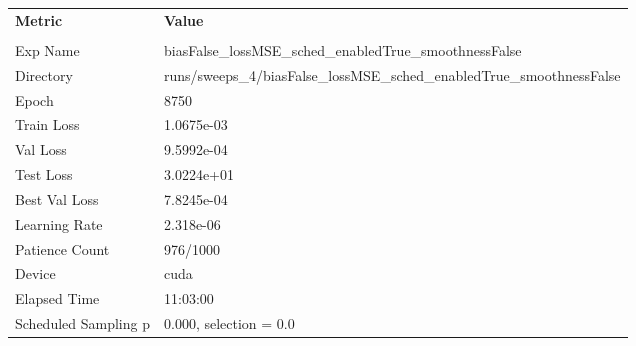 \begin{tabular}{|l|l|}
\hline
\textbf{Metric} & \textbf{Value} \\\\
Exp Name & biasFalse_lossMSE_sched_enabledTrue_smoothnessFalse \\ 
Directory & runs/sweeps_4/biasFalse_lossMSE_sched_enabledTrue_smoothnessFalse \\ 
Epoch & 8750 \\ 
Train Loss & 1.0675e-03 \\ 
Val Loss & 9.5992e-04 \\ 
Test Loss & 3.0224e+01 \\ 
Best Val Loss & 7.8245e-04 \\ 
Learning Rate & 2.318e-06 \\ 
Patience Count & 976/1000 \\ 
Device & cuda \\ 
Elapsed Time & 11:03:00 \\ 
Scheduled Sampling p & 0.000, selection = 0.0 \\ 
\hline
\end{tabular}